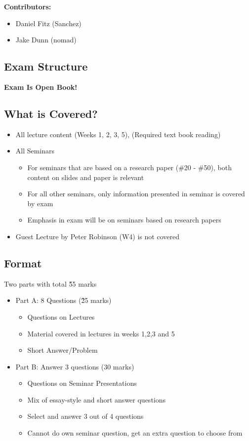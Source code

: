 \documentclass[12pt, a4paper]{article}
\begin{document}
	\tableofcontents
	\vspace{2em}
	\textbf{Contributors:}
	\begin{itemize}
		\item Daniel Fitz (Sanchez)
		\item Jake Dunn (nomad)
	\end{itemize}
	\newpage

	\begin{multicols*}{2}

\section{Exam Structure}
\textbf{Exam Is Open Book!}
\subsection{What is Covered?}
\begin{itemize}
	\item All lecture content (Weeks 1, 2, 3, 5), (Required text book reading)
	\item All Seminars
	\begin{itemize}
		\item For seminars that are based on a research paper (\#20 - \#50), both content on slides and paper is relevant
		\item For all other seminars, only information presented in seminar is covered by exam
		\item Emphasis in exam will be on seminars based on research papers
	\end{itemize}
	\item Guest Lecture by Peter Robinson (W4) is not covered
\end{itemize}
\subsection{Format}
Two parts with total \~ 55 marks
\begin{itemize}
	\item Part A: 8 Questions (\~25 marks)
	\begin{itemize}
		\item Questions on Lectures
		\item Material covered in lectures in weeks 1,2,3 and 5
		\item Short Answer/Problem
	\end{itemize}
	\item Part B: Answer 3 questions (30 marks)
	\begin{itemize}
		\item Questions on Seminar Presentations
		\item Mix of essay-style and short answer questions
		\item Select and answer 3 out of 4 questions
		\item Cannot do own seminar question, get an extra question to choose from
	\end{itemize}
\end{itemize}

\end{multicols*}
\end{document}
